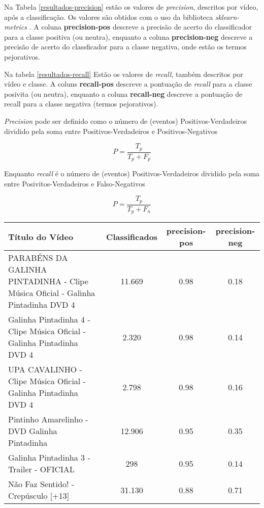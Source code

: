 Na Tabela \ref{resultados-precision} estão os valores de \textit{precision}, descritos por vídeo, após a classificação. Os valores são obtidos com o uso da biblioteca \textit{sklearn-metrics} \cite{scikit-learn}. A coluna \textbf{precision-pos} descreve a precisão de acerto do classificador para a classe positiva (ou neutra), enquanto a coluna \textbf{precision-neg} descreve a precisão de acerto do classficador para a classe negativa, onde estão os termos pejorativos.

Na tabela \ref{resultados-recall} Estão os valores de \textit{recall}, também descritos por vídeo e classe. A coluns \textbf{recall-pos} descreve a pontuação de \textit{recall} para a classe posivita (ou neutra), enquanto a coluna \textbf{recall-neg} descreve a pontuação de recall para a classe negativa (termos pejorativos).


\textit{Precision} pode ser definido como o número de (eventos) Positivos-Verdadeiros dividido pela soma entre Positivos-Verdadeiros e Positivos-Negativos

\begin{equation}
\label{eq:precision-descr}
 {P} = \frac{{T_p}}{{T_p}+{F_p}}
\end{equation}

Enquanto \textit{recall} é o número de (eventos) Positivos-Verdadeiros dividido pela soma entre Posivitos-Verdadeiros e Falso-Negativos

\begin{equation}
\label{eq:recall-descr}
 {P} = \frac{{T_p}}{{T_p}+{F_n}}
\end{equation}

\begin{table}[H]
	
\begin{tabular}{|p{5.5cm}|c|c|c|}
\hline
\textbf{Título do Vídeo} & \textbf{Classificados} & \textbf{precision-pos} & \textbf{precision-neg} \\ \hline
PARABÉNS DA GALINHA PINTADINHA - Clipe Música Oficial - Galinha Pintadinha DVD 4 & 11.669 & 0.98 & 0.18 \\ \hline
Galinha Pintadinha 4 - Clipe Música Oficial - Galinha Pintadinha DVD 4 & 2.320 & 0.98 & 0.14 \\ \hline
UPA CAVALINHO - Clipe Música Oficial - Galinha Pintadinha DVD 4 & 2.798 & 0.98 & 0.16 \\ \hline
Pintinho Amarelinho - DVD Galinha Pintadinha & 12.906 & 0.95 & 0.35 \\ \hline
Galinha Pintadinha 3 - Trailer - OFICIAL & 298 & 0.95 & 0.14 \\ \hline
Não Faz Sentido! - Crepúsculo [+13] & 31.130 & 0.88 & 0.71\\ \hline
\end{tabular}

\end{table}

